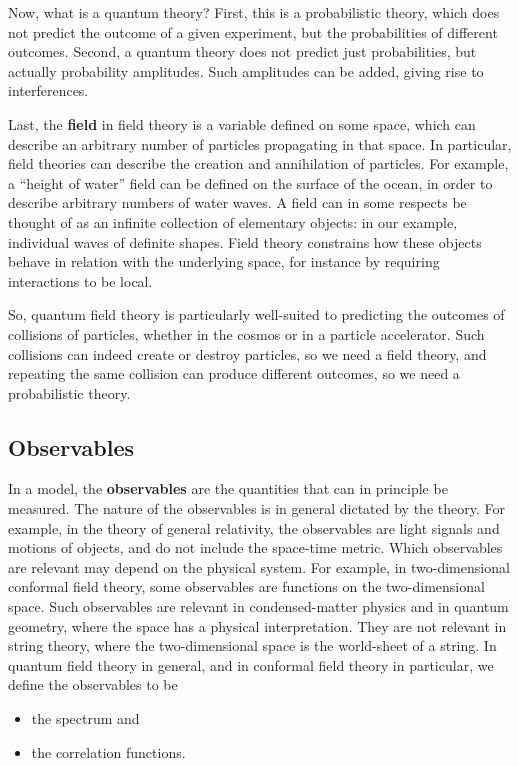 \documentclass[12pt, a4paper, notitlepage, twoside]{report}
\numberwithin{equation}{section}
\theoremstyle{break}
\begin{document}
Now, what is a quantum theory? First, this is a probabilistic theory, which does not predict the outcome of a given experiment, but the probabilities of different outcomes.
Second, a quantum theory does not predict just probabilities, but actually probability amplitudes.
Such amplitudes can be added, giving rise to interferences. 

Last, the \textbf{\boldmath field} in field theory is a variable defined on some space, which can describe an arbitrary number of particles propagating in that space.
In particular, field theories can describe the creation and annihilation of particles.
For example, a ``height of water'' field can be defined on the surface of the ocean, in order to describe arbitrary numbers of water waves.
A field can in some respects be thought of as an infinite collection of elementary objects: in our example, individual waves of definite shapes.
Field theory constrains how these objects behave in relation with the underlying space, for instance by requiring interactions to be local.

So, quantum field theory is particularly well-suited to predicting the outcomes of collisions of particles, whether in the cosmos or in a particle accelerator.
Such collisions can indeed create or destroy particles, so we need a field theory, and repeating the same collision can produce different outcomes, so we need a probabilistic theory. 

\subsection{Observables}

In a model, the \textbf{\boldmath observables} are the quantities that can in principle be measured.
The nature of the observables is in general dictated by the theory.
For example, in the theory of general relativity, the observables are light signals and motions of objects, and do not include the space-time metric. 
Which observables are relevant may depend on the physical system.
For example, in two-dimensional conformal field theory, some observables are functions on the two-dimensional space.
Such observables are relevant in condensed-matter physics and in quantum geometry, where the space has a physical interpretation.
They are not relevant in string theory, where the two-dimensional space is the world-sheet of a string. 
In quantum field theory in general, and in conformal field theory in particular, we define the observables to be 
\begin{itemize}
 \item the spectrum and
\item the correlation functions.
\end{itemize}
\end{document}
